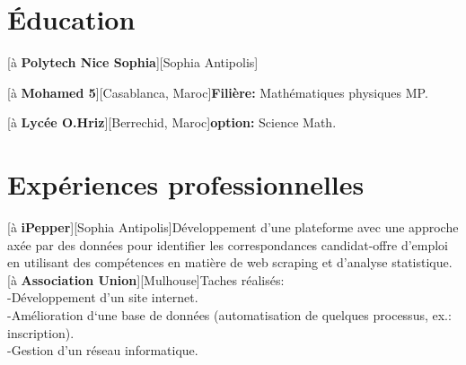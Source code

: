 \documentclass[a4paper]{hamza-cv}
\begin{document}
\begin{textblock}{20.5}
\begin{minipage}[t]{0.37\textwidth}

      

  \end{minipage}\hfill\begin{minipage}[t]{0.61\textwidth}

  
    \section{Éducation}
      \begin{rightenv}
        [à \textbf{Polytech Nice Sophia}][Sophia Antipolis]

        [à \textbf{Mohamed 5}][Casablanca, Maroc]{\textbf{Filière:} Mathématiques physiques MP.}

        [à \textbf{Lycée O.Hriz}][Berrechid, Maroc]{\textbf{option:} Science Math.}
      \end{rightenv}
      
      
\section{Expériences professionnelles}

 

      \begin{rightenv}

        [à \textbf{iPepper}][Sophia Antipolis]{Développement d'une plateforme avec une approche axée par des données pour identifier les correspondances candidat-offre d'emploi en utilisant des compétences en matière de web scraping et d'analyse statistique. }
        [à \textbf{Association Union}][Mulhouse]{Taches réalisés:\\
        -Développement d'un site internet.\\
        -Amélioration d‘une base de données (automatisation de quelques processus, ex.: inscription).\\
        -Gestion d'un réseau informatique.}
        

\end{rightenv}
\end{minipage}
\end{textblock}
\end{document}
